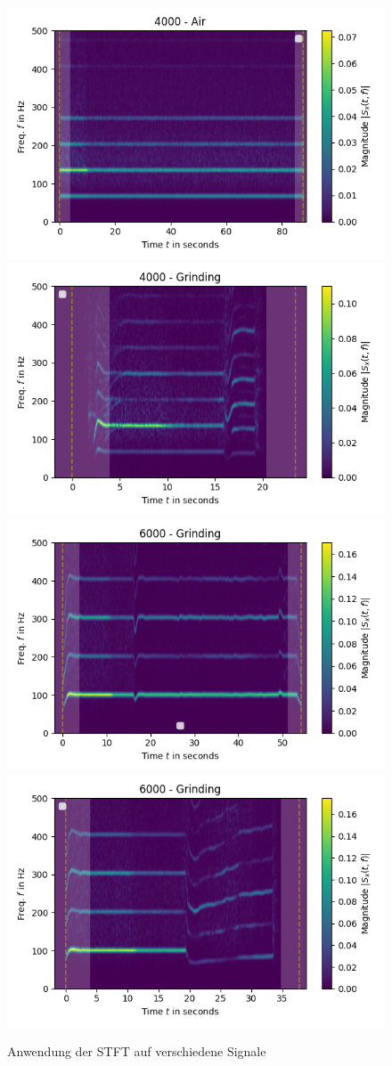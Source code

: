 \begin{figure}[H]
    \includegraphics[width=0.5\linewidth]{Studienarbeit//images/stft-4000-air.png}    
    \includegraphics[width=0.5\linewidth]{Studienarbeit//images/stft-4000-grinding.png}
    \includegraphics[width=0.5\linewidth]{Studienarbeit//images/stft-6000-grinding.png}
    \includegraphics[width=0.5\linewidth]{Studienarbeit//images/stft-6000-grinding-hard.png}
    \caption{Anwendung der STFT auf verschiedene Signale}
    \label{fig:verschiedene-stft}
\end{figure}

